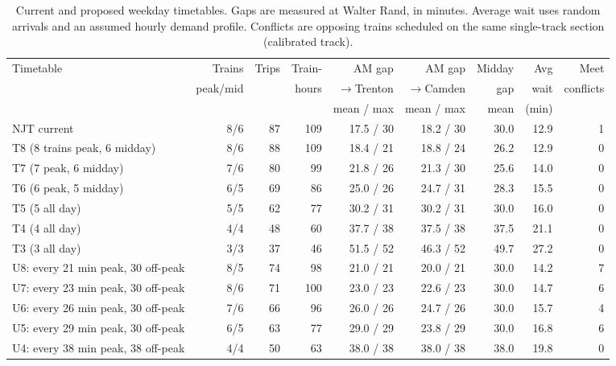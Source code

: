 \documentclass[11pt]{article}
\begin{document}
\begin{table}[ht]\centering\small
\begin{tabular}{@{}lrrrrrrrr@{}}
\toprule
Timetable & Trains & Trips & Train- & AM gap & AM gap & Midday & Avg & Meet \\
 & peak/mid & & hours & $\to$Trenton & $\to$Camden & gap & wait & conflicts \\
 & & & & mean / max & mean / max & mean & (min) & \\
\midrule
NJT current & 8/6 & 87 & 109 & 17.5 / 30 & 18.2 / 30 & 30.0 & 12.9 & 1 \\
\midrule
T8 (8 trains peak, 6 midday) & 8/6 & 88 & 109 & 18.4 / 21 & 18.8 / 24 & 26.2 & 12.9 & 0 \\
T7 (7 peak, 6 midday) & 7/6 & 80 & 99 & 21.8 / 26 & 21.3 / 30 & 25.6 & 14.0 & 0 \\
T6 (6 peak, 5 midday) & 6/5 & 69 & 86 & 25.0 / 26 & 24.7 / 31 & 28.3 & 15.5 & 0 \\
T5 (5 all day) & 5/5 & 62 & 77 & 30.2 / 31 & 30.2 / 31 & 30.0 & 16.0 & 0 \\
T4 (4 all day) & 4/4 & 48 & 60 & 37.7 / 38 & 37.5 / 38 & 37.5 & 21.1 & 0 \\
T3 (3 all day) & 3/3 & 37 & 46 & 51.5 / 52 & 46.3 / 52 & 49.7 & 27.2 & 0 \\
\midrule
U8: every 21 min peak, 30 off-peak & 8/5 & 74 & 98 & 21.0 / 21 & 20.0 / 21 & 30.0 & 14.2 & 7 \\
U7: every 23 min peak, 30 off-peak & 8/6 & 71 & 100 & 23.0 / 23 & 22.6 / 23 & 30.0 & 14.7 & 6 \\
U6: every 26 min peak, 30 off-peak & 7/6 & 66 & 96 & 26.0 / 26 & 24.7 / 26 & 30.0 & 15.7 & 4 \\
U5: every 29 min peak, 30 off-peak & 6/5 & 63 & 77 & 29.0 / 29 & 23.8 / 29 & 30.0 & 16.8 & 6 \\
U4: every 38 min peak, 38 off-peak & 4/4 & 50 & 63 & 38.0 / 38 & 38.0 / 38 & 38.0 & 19.8 & 0 \\
\bottomrule
\end{tabular}
\caption{Current and proposed weekday timetables. Gaps are measured at Walter Rand, in minutes. Average wait uses random arrivals and an assumed hourly demand profile. Conflicts are opposing trains scheduled on the same single-track section (calibrated track).}\label{tab:tt}
\end{table}
\end{document}
